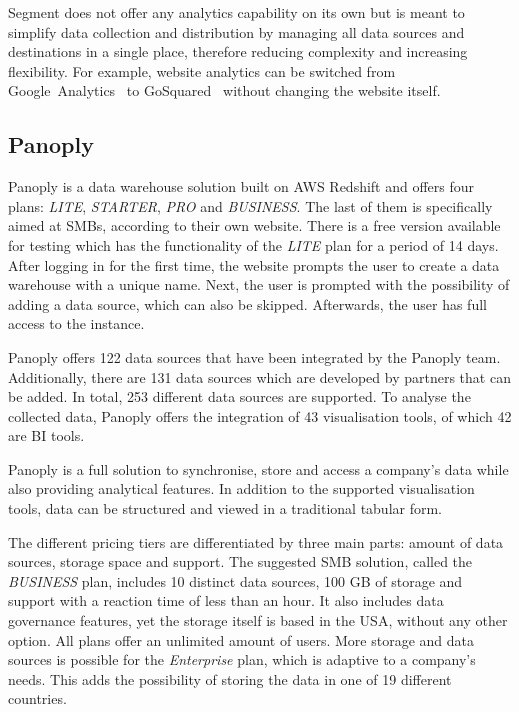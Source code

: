 \documentclass[../paper.tex]{subfiles}
\begin{document}
Segment does not offer any analytics capability on its own but is meant to
simplify data collection and distribution by managing all data sources and
destinations in a single place, therefore reducing complexity and increasing
flexibility. For example, website analytics can be switched from
Google~Analytics~\cite{google_analytics} to GoSquared~\cite{gosquared} without
changing the website itself.

\subsection{Panoply}

Panoply is a data warehouse solution built on AWS Redshift and offers four
plans: \textit{LITE}, \textit{STARTER}, \textit{PRO} and \textit{BUSINESS}. The
last of them is specifically aimed at SMBs, according to their own website.
There is a free version available for testing which has the functionality of
the \textit{LITE} plan for a period of 14 days. After logging in for the first
time, the website prompts the user to create a data warehouse with a unique
name. Next, the user is prompted with the possibility of adding a data source,
which can also be skipped. Afterwards, the user has full access to the
instance.

Panoply offers 122 data sources that have been integrated by the Panoply team.
Additionally, there are 131 data sources which are developed by partners that
can be added. In total, 253 different data sources are supported. To analyse
the collected data, Panoply offers the integration of 43 visualisation tools,
of which 42 are BI tools.

Panoply is a full solution to synchronise, store and access a company’s data
while also providing analytical features. In addition to the supported
visualisation tools, data can be structured and viewed in a traditional tabular
form.

The different pricing tiers are differentiated by three main parts: amount of
data sources, storage space and support. The suggested SMB solution, called the
\textit{BUSINESS} plan, includes 10 distinct data sources, 100 GB of storage
and support with a reaction time of less than an hour. It also includes data
governance features, yet the storage itself is based in the USA, without any
other option. All plans offer an unlimited amount of users. More storage and
data sources is possible for the \textit{Enterprise} plan, which is adaptive to
a company’s needs. This adds the possibility of storing the data in one of 19
different countries.
\end{document}
